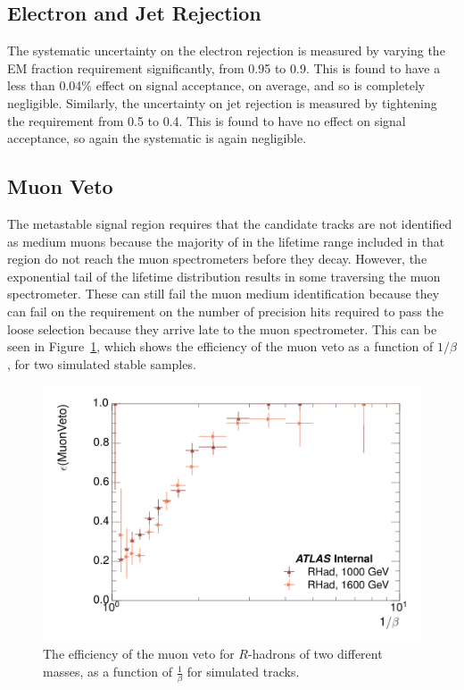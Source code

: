 \subsection{Electron and Jet Rejection}
The systematic uncertainty on the electron rejection is measured by varying the EM fraction requirement significantly, from 0.95 to 0.9. 
This is found to have a less than 0.04\% effect on signal acceptance, on average, and so is completely negligible. Similarly, the uncertainty on jet rejection is measured by tightening the \ep requirement from 0.5 to 0.4. 
This is found to have no effect on signal acceptance, so again the systematic is again negligible.

\subsection{Muon Veto}
The metastable signal region requires that the candidate tracks are not identified as medium muons because the majority of \rhadrons in the lifetime range included in that region do not reach the muon spectrometers before they decay. 
However, the exponential tail of the \rhadron lifetime distribution results in some \rhadrons traversing the muon spectrometer. 
These can still fail the muon medium identification because they can fail on the requirement on the number of precision hits required to pass the loose selection because they arrive late to the muon spectrometer.
This can be seen in Figure~\ref{fig:muonVeto_eff}, which shows the efficiency of the muon veto as a function of $1/\beta$, for two simulated stable \rhadron samples.

\begin{figure}[hbtp]
\centering
\includegraphics[width=\fullfig]{figures/veff_invbeta.png}
\caption{The efficiency of the muon veto for $R$-hadrons of two different masses, as a function of $\frac{1}{\beta}$ for simulated \rhadron tracks.}
\label{fig:muonVeto_eff}
\end{figure}

